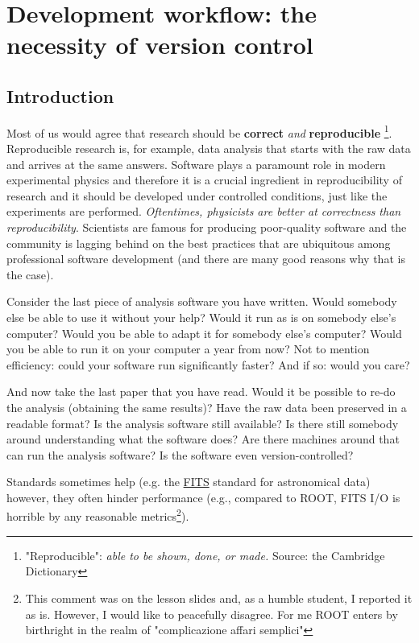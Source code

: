 \section{Development workflow: the necessity of version control}

\subsection{Introduction}
Most of us would agree that research should be \textbf{correct} \emph{and} \textbf{reproducible} \footnote{"Reproducible": \emph{able to be shown, done, or made.} Source: the Cambridge Dictionary}.
Reproducible research is, for example, data analysis that starts with the raw data and arrives at the same answers. Software plays a paramount role in modern experimental physics and therefore it is a crucial ingredient in reproducibility of research and it should be developed under controlled conditions, just like the experiments are performed. \textit{Oftentimes, physicists are better at correctness than reproducibility}. Scientists are famous for producing poor-quality software and the community is lagging behind on the best practices that are ubiquitous among professional software development (and there are many good reasons why that is the case). 

Consider the last piece of analysis software you have written. Would somebody else be able to use it without your help? Would it run as is on somebody else's computer? Would you be able to adapt it for somebody else's computer? Would you be able to run it on your computer a year from now?
Not to mention efficiency: could your software run significantly faster? And if so: would you care?

And now take the last paper that you have read.  Would it be possible to re-do the analysis (obtaining the same results)? Have the raw data been preserved in a readable format? Is the analysis software still available? Is there still somebody around understanding what the software does? Are there machines around that can run the analysis software? Is the software even version-controlled?

Standards sometimes help (e.g. the \href{https://fits.gsfc.nasa.gov/fits\_standard.html}{FITS} standard for astronomical data) however, they often hinder performance (e.g., compared to ROOT, FITS I/O is horrible by any reasonable metrics\footnote{This comment was on the lesson slides and, as a humble student, I reported it as is. However, I would like to peacefully disagree. For me ROOT enters by birthright in the realm of "complicazione affari semplici"}).

